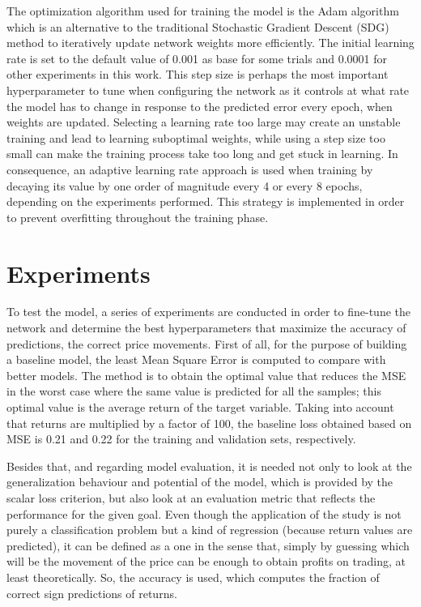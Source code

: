\documentclass[10pt,twocolumn,letterpaper]{article}
\begin{document}
The optimization algorithm used for training the model is the Adam algorithm which is an alternative to the traditional Stochastic Gradient Descent (SDG) method to iteratively update network weights more efficiently. The initial learning rate is set to the default value of 0.001 as base for some trials and 0.0001 for other experiments in this work. This step size is perhaps the most important hyperparameter to tune when configuring the network as it controls at what rate the model has to change in response to the predicted error every epoch, when weights are updated. Selecting a learning rate too large may create an unstable training and lead to learning suboptimal weights, while using a step size too small can make the training process take too long and get stuck in learning. In consequence, an adaptive learning rate approach is used when training by decaying its value by one order of magnitude every 4 or every 8 epochs, depending on the experiments performed. This strategy is implemented in order to prevent overfitting throughout the training phase.

\section{Experiments}

To test the model, a series of experiments are conducted in order to fine-tune the network and determine the best hyperparameters that maximize the accuracy of predictions, \ie the correct price movements. First of all, for the purpose of building a baseline model, the least Mean Square Error is computed to compare with better models. The method is to obtain the optimal value that reduces the MSE in the worst case where the same value is predicted for all the samples; this optimal value is the average return of the target variable. Taking into account that returns are multiplied by a factor of 100, the baseline loss obtained based on MSE is 0.21 and 0.22 for the training and validation sets, respectively.

Besides that, and regarding model evaluation, it is needed not only to look at the generalization behaviour and potential of the model, which is provided by the scalar loss criterion, but also look at an evaluation metric that reflects the performance for the given goal. Even though the application of the study is not purely a classification problem but a kind of regression (because return values are predicted), it can be defined as a one in the sense that, simply by guessing which will be the movement of the price can be enough to obtain profits on trading, at least theoretically. So, the accuracy is used, which computes the fraction of correct sign predictions of returns.
\end{document}
